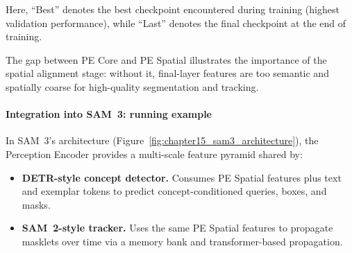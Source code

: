 \begin{enrichment}
\begin{enrichment}
		Here, ``Best'' denotes the best checkpoint encountered during training (highest validation performance), while ``Last'' denotes the final checkpoint at the end of training. 
		
		The gap between PE Core and PE Spatial illustrates the importance of the spatial alignment stage: without it, final-layer features are too semantic and spatially coarse for high-quality segmentation and tracking.
		
		\paragraph{Integration into SAM~3: running example}
		
		In SAM~3’s architecture (Figure~\ref{fig:chapter15_sam3_architecture}), the Perception Encoder provides a multi-scale feature pyramid shared by:
		\begin{itemize}
			\item \textbf{DETR-style concept detector.} Consumes PE Spatial features plus text and exemplar tokens to predict concept-conditioned queries, boxes, and masks.
			\item \textbf{SAM~2-style tracker.} Uses the same PE Spatial features to propagate masklets over time via a memory bank and transformer-based propagation.
		\end{itemize}
		

\end{enrichment}
\end{enrichment}
